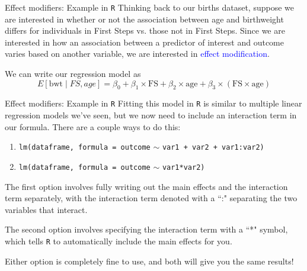 \documentclass[10pt,t]{beamer}
\begin{document}
\begin{frame}{Effect modifiers: Example in \texttt{R}}
Thinking back to our births dataset, suppose we are interested in whether or not the association between age and birthweight differs for individuals in First Steps vs. those not in First Steps. Since we are interested in how an association between a predictor of interest and outcome varies based on another variable, we are interested in \textcolor{blue}{effect modification}. \pause

\vspace{0.3cm}

We can write our regression model as 
$$
E[\text{bwt} \mid FS, age] = \beta_0 + \beta_1 \times \text{FS} + \beta_2 \times \text{age} + \beta_3 \times (\text{FS} \times \text{age})
$$

\end{frame}

\begin{frame}{Effect modifiers: Example in \texttt{R}}
Fitting this model in \texttt{R} is similar to multiple linear regression models we've seen, but we now need to include an interaction term in our formula. There are a couple ways to do this:

\vspace{0.3cm}

\begin{enumerate}
	\item \texttt{lm(dataframe, formula = outcome} $\sim$ \texttt{var1 + var2 + var1:var2)}
	\item \texttt{lm(dataframe, formula = outcome} $\sim$ \texttt{var1*var2)}
\end{enumerate}

\vspace{0.3cm}

The first option involves fully writing out the main effects and the interaction term separately, with the interaction term denoted with a ``:" separating the two variables that interact.

\vspace{0.3cm}

The second option involves specifying the interaction term with a ``*" symbol, which tells \texttt{R} to automatically include the main effects for you.

\vspace{0.3cm}

Either option is completely fine to use, and both will give you the same results!

\end{frame}
\end{document}
